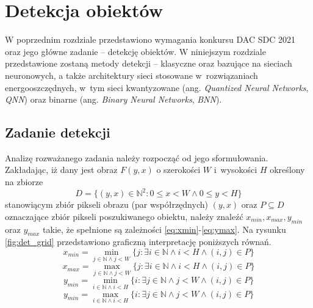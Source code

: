 \chapter{Detekcja obiektów}
\label{ch:detekcja}
W poprzednim rozdziale przedstawiono wymagania konkursu DAC SDC 2021 oraz jego główne zadanie -- detekcję obiektów. 
W niniejszym rozdziale przedstawione zostaną metody detekcji -- klasyczne oraz bazujące na sieciach neuronowych, 
a także architektury sieci stosowane w~rozwiązaniach energooszczędnych, w~tym sieci kwantyzowane (ang. \emph{Quantized Neural Networks}, \emph{QNN}) oraz binarne (ang. \emph{Binary Neural Networks}, \emph{BNN}).

\section{Zadanie detekcji}

Analizę rozważanego zadania należy rozpocząć od jego sformułowania. 
Zakładając, iż dany jest obraz $F(y,x)$ 
o szerokości $W$ i~wysokości $H$
określony na zbiorze 
\begin{equation}
D = \{(y,x) \in \mathbb{N} ^2 : 0 \leq x < W \land 0 \leq y < H\}
\end{equation}
stanowiącym zbiór pikseli obrazu (par współrzędnych) $(y,x)$ 
oraz $P \subseteq D$ oznaczające zbiór pikseli poszukiwanego obiektu, należy znaleźć $x_{min},x_{max},y_{min}$ oraz $y_{max}$ takie, że spełnione są zależności \eqref{eq:xmin}-\eqref{eq:ymax}.
Na rysunku \ref{fig:det_grid} przedstawiono graficzną interpretację poniższych równań.
\begin{equation}
x_{min} = \min_{j \in \mathbb{N} \land j < W }\{j : \exists i \in \mathbb{N} \land i < H \land (i,j) \in P \}
\label{eq:xmin}
\end{equation}
\begin{equation}
x_{max} = \max_{j \in \mathbb{N} \land j < W }\{j : \exists i \in \mathbb{N} \land i < H  \land (i,j) \in P \}
\label{eq:xmax}
\end{equation}
\begin{equation}
y_{min} = \min_{i \in \mathbb{N} \land i < H }\{i : \exists j \in \mathbb{N} \land j < W \land (i,j) \in P \}
\label{eq:ymin}
\end{equation}
\begin{equation}
y_{min} = \max_{i \in \mathbb{N} \land i < H }\{i: \exists j \in \mathbb{N} \land j < W \land (i,j) \in P \}
\label{eq:ymax}
\end{equation}

